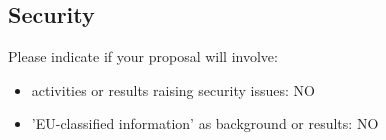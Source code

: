 \documentclass[noworkareas,deliverables,\classoptions]{euproposal}       %
\begin{document}
\begin{proposal}
\subsection{Security}

Please indicate if your proposal will involve:

\begin{itemize}
\item activities or results raising security issues: NO
\item 'EU-classified information' as background or results: NO
\end{itemize}
\end{proposal}
\end{document}
